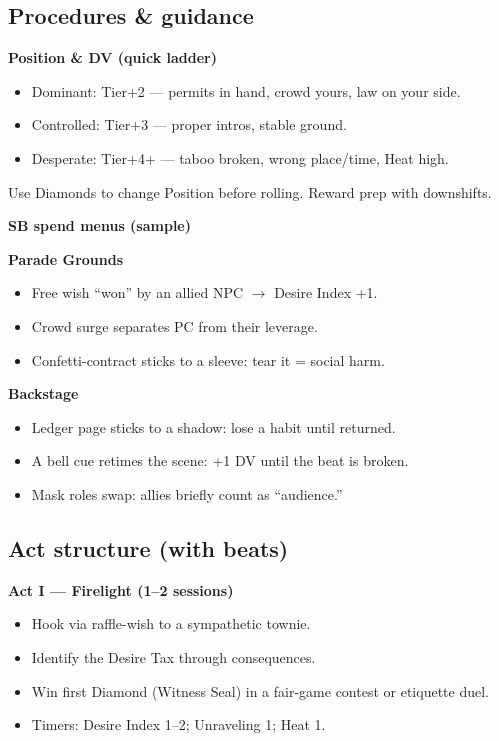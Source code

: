 \documentclass[11pt]{article}
\newcommand{\divider}{\vspace{12pt}\noindent\makebox[\linewidth]{\rule{\textwidth}{0.4pt}}\vspace{12pt}}
\begin{document}
\divider

\subsection*{Procedures \& guidance}

\textbf{Position \& DV (quick ladder)}
\begin{itemize}
\item Dominant: Tier+2 --- permits in hand, crowd yours, law on your side.
\item Controlled: Tier+3 --- proper intros, stable ground.
\item Desperate: Tier+4+ --- taboo broken, wrong place/time, Heat high.
\end{itemize}

Use Diamonds to change Position before rolling. Reward prep with downshifts.

\textbf{SB spend menus (sample)}

\textbf{Parade Grounds}
\begin{itemize}
\item Free wish ``won'' by an allied NPC $\rightarrow$ Desire Index +1.
\item Crowd surge separates PC from their leverage.
\item Confetti-contract sticks to a sleeve: tear it = social harm.
\end{itemize}

\textbf{Backstage}
\begin{itemize}
\item Ledger page sticks to a shadow: lose a habit until returned.
\item A bell cue retimes the scene: +1 DV until the beat is broken.
\item Mask roles swap: allies briefly count as ``audience.''
\end{itemize}

\divider

\subsection*{Act structure (with beats)}

\textbf{Act I --- Firelight (1--2 sessions)}
\begin{itemize}
\item Hook via raffle-wish to a sympathetic townie.
\item Identify the Desire Tax through consequences.
\item Win first Diamond (Witness Seal) in a fair-game contest or etiquette duel.
\item Timers: Desire Index 1--2; Unraveling 1; Heat 1.
\end{itemize}
\end{document}
